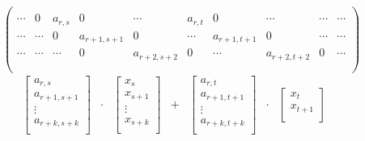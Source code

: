 \documentclass{article}
\begin{document}
      \begin{figure}[ht]
        \centering
        $$
        \begin{pmatrix}
          \\
          \cdots & 0 & a_{r,s} & 0 & \cdots & a_{r,t} & 0 & \cdots & \cdots & \cdots \\
          \cdots & \cdots & 0 & a_{r+1,s+1} & 0 & \cdots & a_{r+1,t+1} & 0 & \cdots & \cdots \\
          \cdots & \cdots & \cdots & 0 & a_{r+2,s+2} & 0 & \cdots & a_{r+2,t+2} & 0 & \cdots \\
          \\
        \end{pmatrix}
        $$
        $$
        \begin{matrix}
          \begin{bmatrix}
            a_{r,s}     \\
            a_{r+1,s+1} \\
               \vdots   \\
            a_{r+k,s+k} \\
          \end{bmatrix} & \cdot & \begin{bmatrix}
                                    x_s      \\
                                    x_{s+1}  \\
                                      \vdots \\
                                    x_{s+k}  \\
                                  \end{bmatrix} & + & \begin{bmatrix}
                                                      a_{r,t}     \\
                                                      a_{r+1,t+1} \\
                                                        \vdots    \\
                                                      a_{r+k,t+k} \\
                                                      \end{bmatrix} & \cdot & \begin{bmatrix}
                                                                                x_t \\
                                                                                x_{t+1} \\

\end{bmatrix}
\end{matrix}$$
\end{figure}
\end{document}
